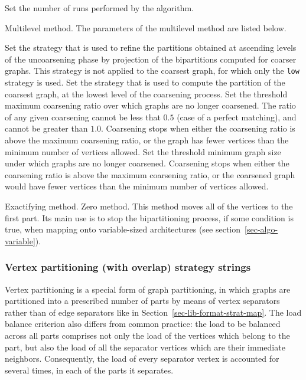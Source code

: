 \begin{itemize}
\begin{itemize}
\iteme[{\tt pass=}{\it nbr}]
Set the number of runs performed by the algorithm.
\end{itemize}
\iteme[{\tt m}]
Multilevel method. The parameters of the multilevel method are listed below.
\begin{itemize}
\iteme[{\tt asc=}{\it strat}]
Set the strategy that is used to refine the partitions obtained
at ascending levels of the uncoarsening phase by projection of the
bipartitions computed for coarser graphs.
This strategy is not applied to the coarsest graph, for which only the
{\tt low} strategy is used.
\iteme[{\tt low=}{\it strat}]
Set the strategy that is used to compute the partition of the
coarsest graph, at the lowest level of the coarsening process.
\iteme[{\tt rat=}{\it rat}]
Set the threshold maximum coarsening ratio over which graphs are no longer
coarsened. The ratio of any given coarsening cannot be less that $0.5$
(case of a perfect matching), and cannot be greater than $1.0$.
Coarsening stops when either the coarsening ratio is above the maximum
coarsening ratio, or the graph has fewer vertices than the minimum number of
vertices allowed.
\iteme[{\tt vert=}{\it nbr}]
Set the threshold minimum graph size under which graphs are no longer
coarsened. Coarsening stops when either the coarsening ratio is above the
maximum coarsening ratio, or the coarsened graph would have fewer
vertices than the minimum number of vertices allowed.
\end{itemize}
\iteme[{\tt x}]
Exactifying method.
\iteme[{\tt z}]
Zero method. This method moves all of the vertices to the first
part. Its main use is to stop the bipartitioning process, if some
condition is true, when mapping onto variable-sized architectures (see
section~\ref{sec-algo-variable}).
\end{itemize}

\subsubsection{Vertex partitioning (with overlap) strategy strings}
\label{sec-lib-format-strat-part-ovl}

Vertex partitioning is a special form of graph partitioning, in which
graphs are partitioned into a prescribed number of parts by means of
vertex separators rather than of edge separators like in
Section~\ref{sec-lib-format-strat-map}. The load balance criterion also
differs from common practice: the load to be balanced across all parts
comprises not only the load of the vertices which belong to the part,
but also the load of all the separator vertices which are their
immediate neighbors. Consequently, the load of every separator vertex
is accounted for several times, in each of the parts it separates.

